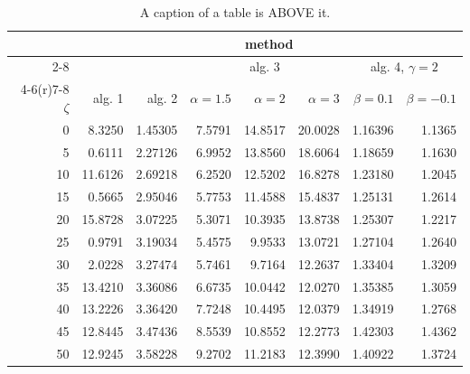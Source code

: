 \documentclass[a4paper,twoside,12pt]{book}
\begin{document}
\begin{table}
\centering
\caption{A caption of a table is ABOVE it.}
\label{tab:results}
\begin{tabular}{rrrrrrrr}
\toprule
	         &                                     \multicolumn{7}{c}{method}                                      \\
	         \cmidrule{2-8}
	         &         &         &        \multicolumn{3}{c}{alg. 3}        & \multicolumn{2}{c}{alg. 4, $\gamma = 2$} \\
	         \cmidrule(r){4-6}\cmidrule(r){7-8}
	$\zeta$ &     alg. 1 &   alg. 2 & $\alpha= 1.5$ & $\alpha= 2$ & $\alpha= 3$ &   $\beta = 0.1$  &   $\beta = -0.1$ \\
\midrule
	       0 &  8.3250 & 1.45305 &       7.5791 &    14.8517 &    20.0028 & 1.16396 &                       1.1365 \\
	       5 &  0.6111 & 2.27126 &       6.9952 &    13.8560 &    18.6064 & 1.18659 &                       1.1630 \\
	      10 & 11.6126 & 2.69218 &       6.2520 &    12.5202 &    16.8278 & 1.23180 &                       1.2045 \\
	      15 &  0.5665 & 2.95046 &       5.7753 &    11.4588 &    15.4837 & 1.25131 &                       1.2614 \\
	      20 & 15.8728 & 3.07225 &       5.3071 &    10.3935 &    13.8738 & 1.25307 &                       1.2217 \\
	      25 &  0.9791 & 3.19034 &       5.4575 &     9.9533 &    13.0721 & 1.27104 &                       1.2640 \\
	      30 &  2.0228 & 3.27474 &       5.7461 &     9.7164 &    12.2637 & 1.33404 &                       1.3209 \\
	      35 & 13.4210 & 3.36086 &       6.6735 &    10.0442 &    12.0270 & 1.35385 &                       1.3059 \\
	      40 & 13.2226 & 3.36420 &       7.7248 &    10.4495 &    12.0379 & 1.34919 &                       1.2768 \\
	      45 & 12.8445 & 3.47436 &       8.5539 &    10.8552 &    12.2773 & 1.42303 &                       1.4362 \\
	      50 & 12.9245 & 3.58228 &       9.2702 &    11.2183 &    12.3990 & 1.40922 &                       1.3724 \\
\bottomrule
\end{tabular}
\end{table}  
\end{document}
